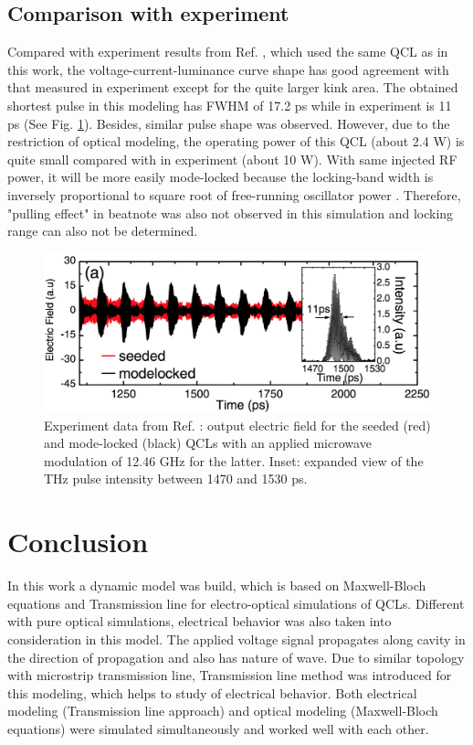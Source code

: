 \documentclass[11pt,final]{scrbook}
\begin{document}
\section{Comparison with experiment}
Compared with experiment results from Ref. \cite{wang2015generating}, which used the same QCL as in this work, the voltage-current-luminance curve shape has good agreement with that measured in experiment except for the quite larger kink area. The obtained shortest pulse in this modeling has FWHM of 17.2 ps while in experiment \cite{wang2015generating} is 11 ps (See Fig. \ref{fig:comparison}). Besides, similar pulse shape was observed. However, due to the restriction of optical modeling, the operating power of this QCL (about 2.4 W) is quite small compared with in experiment (about 10 W). With same injected RF power, it will be more easily mode-locked because the locking-band width is inversely proportional to square root of free-running oscillator power \cite{gellie2010injection}. Therefore, "pulling effect" in beatnote was also not observed in this simulation and locking range can also not be determined.


\begin{figure}[htbp]
\begin{center}
\includegraphics[scale=0.4]{images/comparison.pdf}
\caption{Experiment data from Ref. \cite{wang2015generating}: output electric field for the seeded (red) and mode-locked (black) QCLs with an applied microwave modulation of 12.46 GHz for the latter. Inset: expanded view of the THz pulse intensity between 1470 and 1530 ps. }
\label{fig:comparison}
\end{center}
\end{figure}
\chapter{Conclusion}
In this work a dynamic model was build, which is based on Maxwell-Bloch equations and Transmission line for electro-optical simulations of QCLs. Different with pure optical simulations, electrical behavior was also taken into consideration in this model. The applied voltage signal propagates along cavity in the direction of propagation and also has nature of wave. Due to similar topology with microstrip transmission line, Transmission line method was introduced for this modeling, which helps to study of electrical behavior. Both electrical modeling (Transmission line approach) and optical modeling (Maxwell-Bloch equations) were simulated simultaneously and worked well with each other. 
\end{document}

